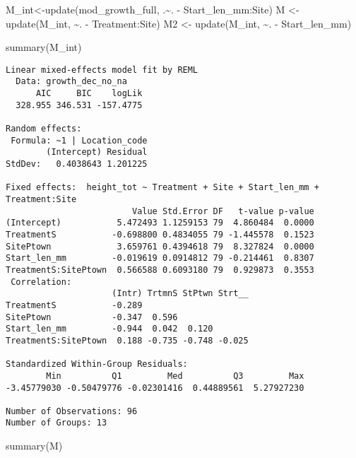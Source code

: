 \documentclass[
  letterpaper,
  DIV=11,
  numbers=noendperiod]{scrartcl}
\newenvironment{Shaded}{\begin{snugshade}}{\end{snugshade}}
\newcommand{\FunctionTok}[1]{\textcolor[rgb]{0.28,0.35,0.67}{#1}}
\newcommand{\NormalTok}[1]{\textcolor[rgb]{0.00,0.23,0.31}{#1}}
\newcommand{\OtherTok}[1]{\textcolor[rgb]{0.00,0.23,0.31}{#1}}
\newcommand{\SpecialCharTok}[1]{\textcolor[rgb]{0.37,0.37,0.37}{#1}}
\begin{document}
\begin{Shaded}
\begin{Highlighting}[]
\NormalTok{M\_int}\OtherTok{\textless{}{-}}\FunctionTok{update}\NormalTok{(mod\_growth\_full, .}\SpecialCharTok{\textasciitilde{}}\NormalTok{. }\SpecialCharTok{{-}}\NormalTok{ Start\_len\_mm}\SpecialCharTok{:}\NormalTok{Site)}
\NormalTok{M }\OtherTok{\textless{}{-}} \FunctionTok{update}\NormalTok{(M\_int, }\SpecialCharTok{\textasciitilde{}}\NormalTok{. }\SpecialCharTok{{-}}\NormalTok{ Treatment}\SpecialCharTok{:}\NormalTok{Site)}
\NormalTok{M2 }\OtherTok{\textless{}{-}} \FunctionTok{update}\NormalTok{(M\_int, }\SpecialCharTok{\textasciitilde{}}\NormalTok{. }\SpecialCharTok{{-}}\NormalTok{ Start\_len\_mm)}

\FunctionTok{summary}\NormalTok{(M\_int)}
\end{Highlighting}
\end{Shaded}

\begin{verbatim}
Linear mixed-effects model fit by REML
  Data: growth_dec_no_na 
      AIC     BIC    logLik
  328.955 346.531 -157.4775

Random effects:
 Formula: ~1 | Location_code
        (Intercept) Residual
StdDev:   0.4038643 1.201225

Fixed effects:  height_tot ~ Treatment + Site + Start_len_mm + Treatment:Site 
                         Value Std.Error DF   t-value p-value
(Intercept)           5.472493 1.1259153 79  4.860484  0.0000
TreatmentS           -0.698800 0.4834055 79 -1.445578  0.1523
SitePtown             3.659761 0.4394618 79  8.327824  0.0000
Start_len_mm         -0.019619 0.0914812 79 -0.214461  0.8307
TreatmentS:SitePtown  0.566588 0.6093180 79  0.929873  0.3553
 Correlation: 
                     (Intr) TrtmnS StPtwn Strt__
TreatmentS           -0.289                     
SitePtown            -0.347  0.596              
Start_len_mm         -0.944  0.042  0.120       
TreatmentS:SitePtown  0.188 -0.735 -0.748 -0.025

Standardized Within-Group Residuals:
        Min          Q1         Med          Q3         Max 
-3.45779030 -0.50479776 -0.02301416  0.44889561  5.27927230 

Number of Observations: 96
Number of Groups: 13 
\end{verbatim}

\begin{Shaded}
\begin{Highlighting}[]
\FunctionTok{summary}\NormalTok{(M)}
\end{Highlighting}
\end{Shaded}
\end{document}
